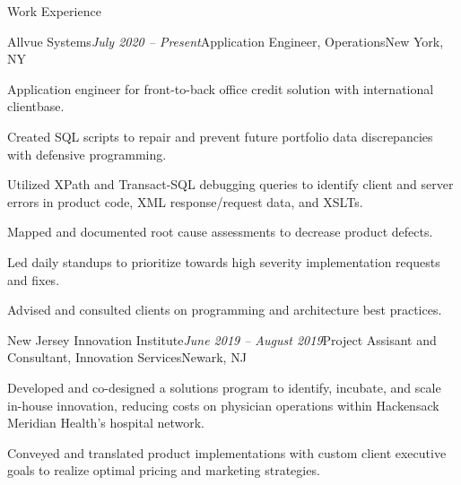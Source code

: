 \documentclass{resume} %
\begin{document}
\begin{rSection}{Work Experience}

\begin{rSubsection}{Allvue Systems}{\em July 2020 -- Present}{Application Engineer, Operations}{New York, NY}
	\item Application engineer for front-to-back office credit solution with international clientbase.
	\item Created SQL scripts to repair and prevent future portfolio data discrepancies with defensive programming.
	\item Utilized XPath and Transact-SQL debugging queries to identify client and server errors in product code, XML response/request data, and XSLTs.
	\item Mapped and documented root cause assessments to decrease product defects.
	\item Led daily standups to prioritize towards high severity implementation requests and fixes.
	\item Advised and consulted clients on programming and architecture best practices.
\end{rSubsection}

\begin{rSubsection}{New Jersey Innovation Institute}{\em June 2019 -- August 2019}{Project Assisant and Consultant, Innovation Services}{Newark, NJ}
	\item Developed and co-designed a solutions program to identify, incubate, and scale in-house innovation, reducing costs on physician operations within Hackensack Meridian Health’s hospital network.
	\item Conveyed and translated product implementations with custom client executive goals to realize optimal pricing and marketing strategies.
 
\end{rSubsection}

\end{rSection}
\end{document}

